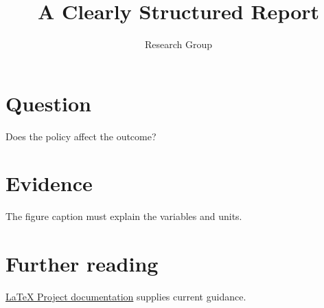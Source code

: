 \documentclass{article}
\begin{document}
\title{A Clearly Structured Report}\author{Research Group}\date{}\maketitle
\section{Question}Does the policy affect the outcome?
\section{Evidence}The figure caption must explain the variables and units.
\section{Further reading}\href{https://www.latex-project.org/}{LaTeX Project documentation} supplies current guidance.
\end{document}
